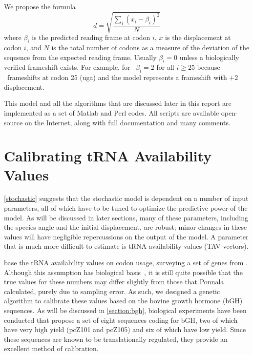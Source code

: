 \documentclass[12pt]{article}
\numberwithin{equation}{section}
\begin{document}
We propose the formula
\begin{equation}
    \label{eqn:lbd}
    d = \sqrt{\frac{\sum_i \left(x_i - \beta_i\right)^2}{N}}
\end{equation}
where $\beta_i$ is the predicted reading frame at codon $i$, $x$ is the displacement at codon $i$,
and $N$ is the total number of codons as a measure of the deviation of the sequence
from the expected reading frame.  Usually $\beta_i = 0$ unless a biologically verified frameshift exists. 
For example, for \prfB\ $\beta_i = 2$ for all $i \geq 25$ because \prfB\ frameshifts at codon 25 (uga)
and the model represents a frameshift with +2 displacement.

This model and all the algorithms that are discussed later in this report
are implemented as a set of Matlab and Perl codes.  All scripts are available
open-source on the Internet, along with full documentation and many comments.

\section{Calibrating tRNA Availability Values}

\autoref{stochastic} suggests that the stochastic model is dependent
on a number of input parameters, all of which have to be tuned to optimize
the predictive power of the model.  As will be discussed in later sections,
many of these parameters, including the species angle and the initial displacement,
are robust; minor changes in these values will have negligible repercussions
on the output of the model.  A parameter that is much more difficult to estimate
is tRNA availability values (TAV vectors).

\citeauthor{lalit:embs} base the tRNA availability values on codon usage, 
surveying a set of genes from \ecoli.
Although this assumption has biological basis~\cite{ikemura}, 
it is still quite possible that the true values for these numbers may differ 
slightly from those that Ponnala calculated, purely due to sampling error.  
As such, we designed a genetic algorithm to calibrate these values based on the bovine growth hormone (bGH) sequences.
As will be discussed in \autoref{section:bgh}, biological experiments
have been conducted \cite{schoner:bgh} that propose a set of eight sequences coding for bGH,
two of which have very high yield (pcZ101 and pcZ105) and six of which have low yield.
Since these sequences are known to be translationally regulated, they
provide an excellent method of calibration.
\end{document}
